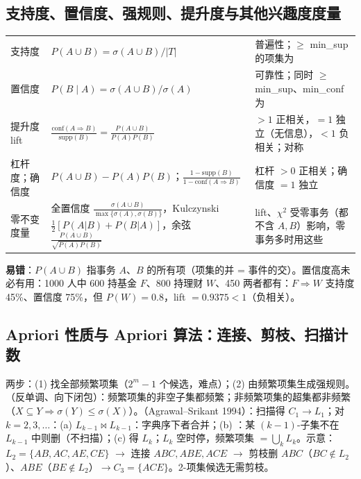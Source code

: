 \subsection{支持度、置信度、强规则、提升度与其他兴趣度度量}
\begin{center}\small
\begin{tabularx}{\linewidth}{@{}p{2.4cm}p{5.4cm}L@{}}
\toprule
支持度 & $P(A\cup B)=\sigma(A\cup B)/|T|$ & 普遍性；$\ge$ min\_sup 的项集为\\
置信度 & $P(B\mid A)=\sigma(A\cup B)/\sigma(A)$ & 可靠性；同时 $\ge$ min\_sup、min\_conf 为\\
提升度 lift & $\frac{\mathrm{conf}(A\Rightarrow B)}{\mathrm{supp}(B)}=\frac{P(A\cup B)}{P(A)P(B)}$ & $>1$ 正相关，$=1$ 独立（无信息），$<1$ 负相关；对称\\
杠杆度；确信度 & $P(A\cup B)-P(A)P(B)$；$\frac{1-\mathrm{supp}(B)}{1-\mathrm{conf}(A\Rightarrow B)}$ & 杠杆 $>0$ 正相关；确信度 $=1$ 独立\\
零不变度量 & 全置信度 $\frac{\sigma(A\cup B)}{\max\{\sigma(A),\sigma(B)\}}$，Kulczynski $\frac12[P(A|B)+P(B|A)]$，余弦 $\frac{P(A\cup B)}{\sqrt{P(A)P(B)}}$ & lift、$\chi^2$ 受零事务（都不含 $A,B$）影响，零事务多时用这些\\
\bottomrule
\end{tabularx}
\end{center}
\textbf{易错}：$P(A\cup B)$ 指事务 $A$、$B$ 的所有项（项集的并 = 事件的交）。置信度高未必有用：1000 人中 600 持基金 $F$、800 持理财 $W$、450 两者都有：$F\Rightarrow W$ 支持度 45\%、置信度 75\%，但 $P(W)=0.8$，lift $=0.9375<1$（负相关）。

\subsection{Apriori 性质与 Apriori 算法：连接、剪枝、扫描计数}
两步：(1) 找全部频繁项集（$2^m-1$ 个候选，难点）；(2) 由频繁项集生成强规则。（反单调、向下闭包）：频繁项集的非空子集都频繁；非频繁项集的超集都非频繁（$X\subseteq Y\Rightarrow\sigma(Y)\le\sigma(X)$）。（Agrawal–Srikant 1994）：扫描得 $C_1\to L_1$；对 $k=2,3,\dots$：(a)  $L_{k-1}\bowtie L_{k-1}$：字典序下者合并；(b) ：某 $(k-1)$-子集不在 $L_{k-1}$ 中则删（不扫描）；(c) 得 $L_k$；$L_k$ 空时停，频繁项集 $=\bigcup_kL_k$。示意：$L_2=\{AB,AC,AE,CE\}$ $\to$ 连接 $ABC,ABE,ACE$ $\to$ 剪枝删 $ABC$（$BC\notin L_2$）、$ABE$（$BE\notin L_2$）$\to C_3=\{ACE\}$。2-项集候选无需剪枝。

